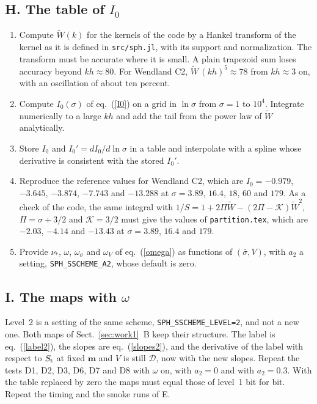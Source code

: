 \documentclass[11pt,aps,preprint,nofootinbib,superscriptaddress,tightenlines]{revtex4-2}
\def\Eq#1{eq.~(\ref{#1})}
\def\Sect#1{Sect.~\ref{#1}}
\begin{document}
\subsection{H. The table of \texorpdfstring{$I_0$}{I0}}

\begin{enumerate}
\item Compute $\widetilde W(k)$ for the kernels of the code by a Hankel transform of the kernel as it is defined in \nolinkurl{src/sph.jl}, with its
  support and normalization.  The transform must be accurate where it is small.  A plain trapezoid sum loses accuracy beyond $kh\approx80$.  For
  Wendland C2, $\widetilde W\,(kh)^5\approx78$ from $kh\approx3$ on, with an oscillation of about ten percent.
\item Compute $I_0(\sigma)$ of \Eq{I0} on a grid in $\ln\sigma$ from $\sigma=1$ to $10^4$.  Integrate numerically to a large $kh$ and add the tail from
  the power law of $\widetilde W$ analytically.
\item Store $I_0$ and $I_0'=dI_0/d\ln\sigma$ in a table and interpolate with a spline whose derivative is consistent with the stored $I_0'$.
\item Reproduce the reference values for Wendland C2, which are $I_0=-0.979$, $-3.645$, $-3.874$, $-7.743$ and $-13.288$ at $\sigma=3.89$, $16.4$,
  $18$, $60$ and $179$.  As a check of the code, the same integral with $1/S=1+2\Pi\widetilde W-(2\Pi-\mathcal K)\widetilde W^2$, $\Pi=\sigma+3/2$ and
  $\mathcal K=3/2$ must give the values of \nolinkurl{partition.tex}, which are $-2.03$, $-4.14$ and $-13.43$ at $\sigma=3.89$, $16.4$ and $179$.
\item Provide $\nu_*$, $\omega$, $\omega_\sigma$ and $\omega_V$ of \Eq{omega} as functions of $(\bar\sigma,V)$, with $a_2$ a setting,
  \texttt{SPH\_SSCHEME\_A2}, whose default is zero.
\end{enumerate}

\subsection{I. The maps with \texorpdfstring{$\omega$}{omega}}

Level~2 is a setting of the same scheme, \texttt{SPH\_SSCHEME\_LEVEL=2}, and not a new one.  Both maps of \Sect{sec:work1}~B keep their structure.
The label is \Eq{label2}, the slopes are \Eq{slopes2}, and the derivative of the label with respect to $S_{\rm t}$ at fixed $\bm m$ and $V$ is still
$\mathcal D$, now with the new slopes.  Repeat the tests D1, D2, D3, D6, D7 and D8 with $\omega$ on, with $a_2=0$ and with $a_2=0.3$.  With the table replaced by
zero the maps must equal those of level~1 bit for bit.  Repeat the timing and the smoke runs of E.
\end{document}
